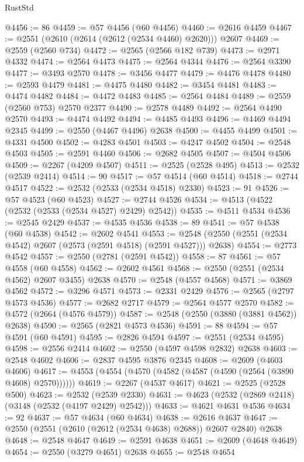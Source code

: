 \begin{lexlean}{RustStd}
\begin{coremodule}
@4456 := 86
@4459 := @57 @4456 (@60 @4456)
@4460 := @2616 @4459
@4467 := @2551 (@2610 (@2614 (@2612 (@2534 @4460) @2620))) @2607
@4469 := @2559 (@2560 @734)
@4472 := @2565 (@2566 @182 @739)
@4473 := @2971 @4332
@4474 := @2564 @4473
@4475 := @2564 @4344
@4476 := @2564 @3390
@4477 := @3493 @2570
@4478 := @3456 @4477
@4479 := @4476 @4478
@4480 := @2593 @4479
@4481 := @4475 @4480
@4482 := @3454 @4481
@4483 := @4474 @4482
@4484 := @4472 @4483
@4485 := @2564 @4484
@4489 := @2559 (@2560 @753) @2570 @2377
@4490 := @2578 @4489
@4492 := @2564 @4490 @2570
@4493 := @4474 @4492
@4494 := @4485 @4493
@4496 := @4469 @4494 @2345
@4499 := @2550 (@4467 @4496) @2638
@4500 := @4455 @4499
@4501 := @4331 @4500
@4502 := @4283 @4501
@4503 := @4247 @4502
@4504 := @2548 @4503
@4505 := @2591 @4460
@4506 := @2682 @4505
@4507 := @4504 @4506
@4509 := @2267 (@4209 @4507)
@4511 := @2525 (@2528 @495)
@4513 := @2532 (@2539 @2414)
@4514 := 90
@4517 := @57 @4514 (@60 @4514)
@4518 := @2744 @4517
@4522 := @2532 (@2533 (@2534 @4518) @2330)
@4523 := 91
@4526 := @57 @4523 (@60 @4523)
@4527 := @2744 @4526
@4534 := @4513 (@4522 (@2532 (@2533 (@2534 @4527) @2429) @2542))
@4535 := @4511 @4534
@4536 := @2545 @2429
@4537 := @4535 @4536
@4538 := 89
@4541 := @57 @4538 (@60 @4538)
@4542 := @2602 @4541
@4553 := @2548 (@2550 (@2551 (@2534 @4542) @2607 (@2573 (@2591 @4518) (@2591 @4527))) @2638)
@4554 := @2773 @4542
@4557 := @2550 (@2781 (@2591 @4542))
@4558 := 87
@4561 := @57 @4558 (@60 @4558)
@4562 := @2602 @4561
@4568 := @2550 (@2551 (@2534 @4562) @2607 @3455) @2638
@4570 := @2548 (@4557 @4568)
@4571 := @3869 @4562
@4572 := @3296 @4571
@4573 := @2331 @2429
@4576 := @2565 (@2797 @4573 @4536)
@4577 := @2682 @2717
@4579 := @2564 @4577 @2570
@4582 := @4572 (@2664 (@4576 @4579))
@4587 := @2548 (@2550 (@3880 (@3881 @4562)) @2638)
@4590 := @2565 (@2821 @4573 @4536)
@4591 := 88
@4594 := @57 @4591 (@60 @4591)
@4595 := @2826 @4594
@4597 := @2551 (@2534 @4595)
@4598 := @2556 @2414
@4602 := @2550 (@4597 @4598 @2832) @2638
@4603 := @2548 @4602
@4606 := @2837 @4595 @3876 @2345
@4608 := @2609 (@4603 @4606)
@4617 := @4553 (@4554 (@4570 (@4582 (@4587 (@4590 (@2564 (@3890 @4608) @2570))))))
@4619 := @2267 (@4537 @4617)
@4621 := @2525 (@2528 @500)
@4623 := @2532 (@2539 @2330)
@4631 := @4623 (@2532 (@2869 @2418) (@3148 (@2532 (@4197 @2429) @2542)))
@4633 := @4621 @4631 @4536
@4634 := 92
@4637 := @57 @4634 (@60 @4634)
@4638 := @2616 @4637
@4647 := @2550 (@2551 (@2610 (@2612 (@2534 @4638) @2688)) @2607 @2840) @2638
@4648 := @2548 @4647
@4649 := @2591 @4638
@4651 := @2609 (@4648 @4649)
@4654 := @2550 (@3279 @4651) @2638
@4655 := @2548 @4654

\end{coremodule}
\end{lexlean}
